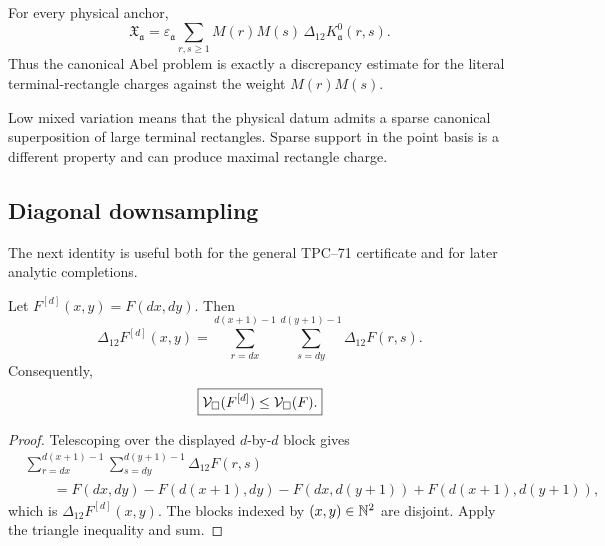 \begin{corollary}
\label{cor:weighted-rectangle-form}
For every physical anchor,
\begin{equation}
 \mathfrak X_{\mathfrak a}
 =
 \varepsilon_{\mathfrak a}
 \sum_{r,s\ge1}
 M(r)M(s)\,
 \Delta_{12}K_{\mathfrak a}^{0}(r,s).
 \label{eq:weighted-rectangle-form}
\end{equation}
Thus the canonical Abel problem is exactly a discrepancy estimate for the
literal terminal-rectangle charges against the weight \(M(r)M(s)\).
\end{corollary}

\begin{remark}
Low mixed variation means that the physical datum admits a sparse
canonical superposition of large terminal rectangles.  Sparse support in
the point basis is a different property and can produce maximal rectangle
charge.
\end{remark}

\subsection{Diagonal downsampling}

The next identity is useful both for the general TPC--71 certificate and
for later analytic completions.

\begin{theorem}
\label{thm:downsampling-contraction}
Let \(F^{[d]}(x,y)=F(dx,dy)\).  Then
\begin{equation}
 \Delta_{12}F^{[d]}(x,y)
 =
 \sum_{r=dx}^{d(x+1)-1}
 \sum_{s=dy}^{d(y+1)-1}
 \Delta_{12}F(r,s).
 \label{eq:downsampling-block-charge}
\end{equation}
Consequently,
\begin{equation}
 \boxed{
 \mathcal V_\square(F^{[d]})
 \le
 \mathcal V_\square(F).}
 \label{eq:downsampling-contraction}
\end{equation}
\end{theorem}

\begin{proof}
Telescoping over the displayed \(d\)-by-\(d\) block gives
\begin{align*}
 &\sum_{r=dx}^{d(x+1)-1}
 \sum_{s=dy}^{d(y+1)-1}\Delta_{12}F(r,s)\\
 &\qquad =
 F(dx,dy)-F(d(x+1),dy)-F(dx,d(y+1))
 +F(d(x+1),d(y+1)),
\end{align*}
which is \(\Delta_{12}F^{[d]}(x,y)\).  The blocks indexed by
\((x,y)\in\mathbb N^2\) are disjoint.  Apply the triangle inequality and sum.
\end{proof}

